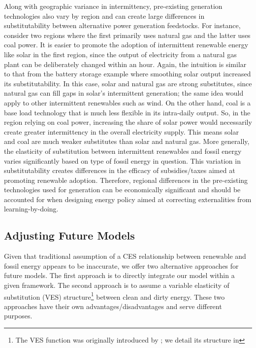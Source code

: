 \documentclass[11pt,a4paper,leqno]{extarticle}
\begin{document}
	Along with geographic variance in intermittency, pre-existing generation technologies also vary by region and can create large differences in substitutability between alternative power generation feedstocks. For instance, consider two regions where the first primarily uses natural gas and the latter uses coal power. It is easier to promote the adoption of intermittent renewable energy like solar in the first region, since the output of electricity from a natural gas plant can be deliberately changed within an hour. Again, the intuition is similar to that from the battery storage example where smoothing solar output increased its substitutability. In this case, solar and natural gas are strong substitutes, since natural gas can fill gaps in solar's intermittent generation; the same idea would apply to other intermittent renewables such as wind.  On the other hand, coal is a base load technology that is much less flexible in its intra-daily output. So, in the region relying on coal power, increasing the share of solar power would necessarily create greater intermittency in the overall electricity supply. This means solar and coal are much weaker substitutes than solar and natural gas. More generally, the elasticity of substitution between intermittent renewables and fossil energy varies significantly based on type of fossil energy in question. This variation in substitutability creates differences in the efficacy of subsidies/taxes aimed at promoting renewable adoption. Therefore, regional differences in the pre-existing technologies used for generation can be economically significant and should be accounted for when designing energy policy aimed at correcting externalities from learning-by-doing. 
	
	
	\subsection{Adjusting Future Models}
	
	Given that traditional assumption of a CES relationship between renewable and fossil energy appears to be inaccurate, we offer two alternative approaches for future models. The first approach is to directly integrate our model within a given framework. The second approach is to assume a variable elasticity of substitution (VES) structure\footnote{ The VES function was originally introduced by \citet{VES}; we detail its structure in  } between clean and dirty energy. These two approaches have their own advantages/disadvantages and serve different purposes. 
	
\end{document}
